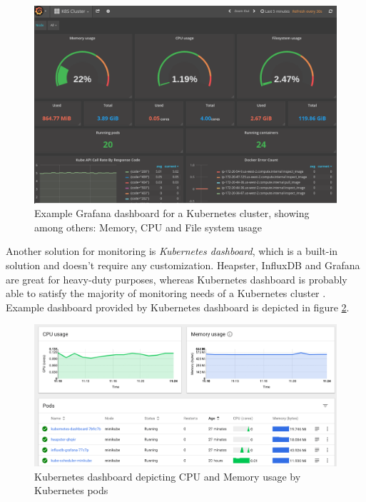 \begin{figure}[H]
  \centering
  \includegraphics[width=15cm]{figures/grafana.png}
  \caption{Example Grafana dashboard for a Kubernetes cluster, showing among others: Memory, CPU and File system usage \cite{monitor-kubernetes-cluster-prometheus-grafana}}
  \label{fig:grafana}
\end{figure}

Another solution for monitoring is \textit{Kubernetes dashboard}, which is a built-in solution and doesn't require any customization. Heapster, InfluxDB and Grafana are great for heavy-duty purposes, whereas Kubernetes dashboard is probably able to satisfy the majority of monitoring needs of a Kubernetes cluster \cite{book-mastering-k8s,book-devops-k8s}. Example dashboard provided by Kubernetes dashboard is depicted in figure \ref{fig:k8s-dashboard}.
\begin{figure}[H]
  \centering
  \includegraphics[width=15cm]{figures/k8s-dashboard.png}
  \caption{Kubernetes dashboard depicting CPU and Memory usage by Kubernetes pods\cite{k8s-dashboard}}
  \label{fig:k8s-dashboard}
\end{figure}

